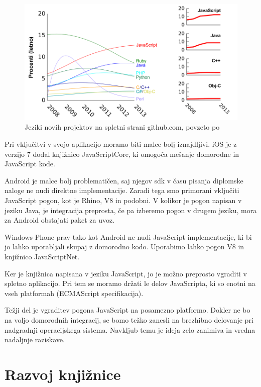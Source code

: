 \begin{figure}
 \includegraphics[width=\linewidth]{github-jeziki}
 \caption{Jeziki novih projektov na spletni strani github.com, povzeto po\cite{redmonk}}
 \label{fig:github-jeziki}
\end{figure}

Pri vključitvi v svojo aplikacijo moramo biti malce bolj iznajdljivi. iOS je z verzijo 7 dodal knjižnico JavaScriptCore\cite{javascriptcore-docs}, ki omogoča mešanje domorodne in JavaScript kode.

Android je malce bolj problematičen, saj njegov \gls{sdk} v času pisanja diplomske naloge ne nudi direktne implementacije. Zaradi tega smo primorani vključiti JavaScript pogon, kot je Rhino, V8 in podobni. V kolikor je pogon napisan v jeziku Java, je integracija preprosta, če pa izberemo pogon v drugem jeziku, mora za Android obstajati paket za uvoz.

Windows Phone prav tako kot Android ne nudi JavaScript implementacije, ki bi jo lahko uporabljali skupaj z domorodno kodo. Uporabimo lahko pogon V8 in knjižnico JavaScriptNet\cite{javascriptdotnet}.

Ker je knjižnica napisana v jeziku JavaScript, jo je možno preprosto vgraditi v spletno aplikacijo. Pri tem se moramo držati le delov JavaScripta, ki so enotni na vseh platformah (ECMAScript specifikacija\cite{ecmascript}).

Težji del je vgraditev pogona JavaScript na posamezno platformo. Dokler ne bo na voljo domorodnih integracij, se bomo težko zanesli na brezhibno delovanje pri nadgradnji operacijskega sistema. Navkljub temu je ideja zelo zanimiva in vredna nadaljnje raziskave.

\chapter{Razvoj knjižnice}
\label{chap:development}

